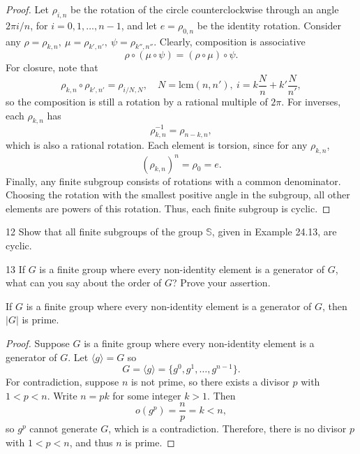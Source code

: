 \begin{proof}
    Let $\rho_{i, n}$ be the rotation of the circle counterclockwise through an angle $2 \pi i / n$, for $i = 0,1, \dots, n-1$, and let $e = \rho_{0,n}$ be the identity rotation. Consider any 
    \(\rho = \rho_{k,n}, \ \mu = \rho_{k',n'}, \ \psi = \rho_{k'',n''}\).  
    Clearly, composition is associative
    \[
        \rho \circ (\mu \circ \psi) = (\rho \circ \mu) \circ \psi.
    \]
    For closure, note that
    \[
        \rho_{k,n} \circ \rho_{k',n'} = \rho_{i/N, N}, \quad N = \mathrm{lcm}(n,n'), \ i = k \frac{N}{n} + k' \frac{N}{n'},
    \]
    so the composition is still a rotation by a rational multiple of $2\pi$.  
    For inverses, each $\rho_{k,n}$ has
    \[
        \rho_{k,n}^{-1} = \rho_{n-k,n},
    \]
    which is also a rational rotation.
    Each element is torsion, since for any $\rho_{k,n}$,
    \[
        (\rho_{k,n})^n = \rho_0 = e.
    \]
    Finally, any finite subgroup consists of rotations with a common denominator. 
    Choosing the rotation with the smallest positive angle in the subgroup, all other elements are powers of this rotation. Thus, each finite subgroup is cyclic.
\end{proof}

\begin{problem}{12}
    Show that all finite subgroups of the group $\mathbb{S}$, given in Example 24.13, are
    cyclic.
\end{problem}
\unsolved

\begin{problem}{13}
    If $G$ is a finite group where every non-identity element is a generator of $G$,
    what can you say about the order of $G$? Prove your assertion.
\end{problem}
\solved

\begin{theorem}
    If $G$ is a finite group where every non-identity element is a generator of $G$,
        then $|G|$ is prime.
\end{theorem}

\begin{proof}
    Suppose $G$ is a finite group where every non-identity element is a generator of $G$.
    Let $\langle g \rangle = G$ so 
    \[
        G = \langle g \rangle = \{g^0, g^1, \ldots, g^{n - 1}\}.
    \]
    For contradiction, suppose $n$ is not prime, so there exists a divisor $p$ with $1 < p < n$.
    Write $n = p k$ for some integer $k > 1$.
    Then 
    \[
        o(g^p) = \frac{n}{p} = k < n,
    \]
    so $g^p$ cannot generate $G$, which is a contradiction.
    Therefore, there is no divisor $p$ with $1 < p < n$, and thus $n$ is prime.
\end{proof}
